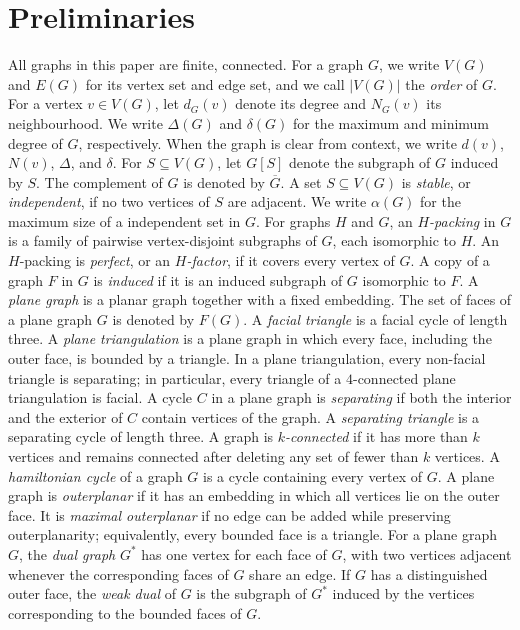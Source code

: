 \documentclass{patmorin}
\newcommand{\defin}[1]{\emph{\textcolor{brightmaroon}{#1}}}
\begin{document}

\section{Preliminaries}

All graphs in this paper are finite, connected. For a graph $G$, we write
$V(G)$ and $E(G)$ for its vertex set and edge set, and we call $|V(G)|$ the
\defin{order} of $G$. For a vertex $v\in V(G)$, let $d_G(v)$ denote its
degree and $N_G(v)$ its neighbourhood. We write $\Delta(G)$ and $\delta(G)$
for the maximum and minimum degree of $G$, respectively. When the graph is
clear from context, we write $d(v)$, $N(v)$, $\Delta$, and $\delta$.
For $S\subseteq V(G)$, let $G[S]$ denote the subgraph of $G$ induced by $S$.
The complement of $G$ is denoted by $\overline G$. A set $S\subseteq V(G)$ is
\defin{stable}, or \defin{independent}, if no two vertices of $S$ are adjacent.
We write $\alpha(G)$ for the maximum size of a independent set  in $G$.
For graphs $H$ and $G$, an \defin{$H$-packing} in $G$ is a family of pairwise
vertex-disjoint subgraphs of $G$, each isomorphic to $H$. An $H$-packing is
\defin{perfect}, or an \defin{$H$-factor}, if it covers every vertex of $G$.
A copy of a graph $F$ in $G$ is \defin{induced} if it is an induced subgraph of
$G$ isomorphic to $F$.
A \defin{plane graph} is a planar graph together with a fixed embedding. The
set of faces of a plane graph $G$ is denoted by $F(G)$. A \defin{facial
triangle} is a facial cycle of length three.
A \defin{plane triangulation} is a plane graph in which every face, including
the outer face, is bounded by a triangle. 
In a plane triangulation, every non-facial triangle is separating; in
particular, every triangle of a $4$-connected plane triangulation is facial.
A cycle $C$ in a plane graph is \defin{separating} if both the interior and
the exterior of $C$ contain vertices of the graph. A \defin{separating
triangle} is a separating cycle of length three.
A graph is \defin{$k$-connected} if it has more than $k$ vertices and remains
connected after deleting any set of fewer than $k$ vertices. 
A \defin{hamiltonian cycle} of a graph $G$ is a cycle containing every vertex of $G$.
A plane graph is \defin{outerplanar} if it has an embedding in which all
vertices lie on the outer face. It is \defin{maximal outerplanar} if no edge
can be added while preserving outerplanarity; equivalently, every bounded
face is a triangle.
For a plane graph $G$, the \defin{dual graph} $G^*$ has one vertex for each face of $G$, with two vertices adjacent whenever the corresponding faces of $G$ share an edge. If $G$ has a distinguished outer face, the \defin{weak dual} of $G$ is the subgraph of $G^*$ induced by the vertices corresponding to the bounded faces of $G$.
\end{document}
